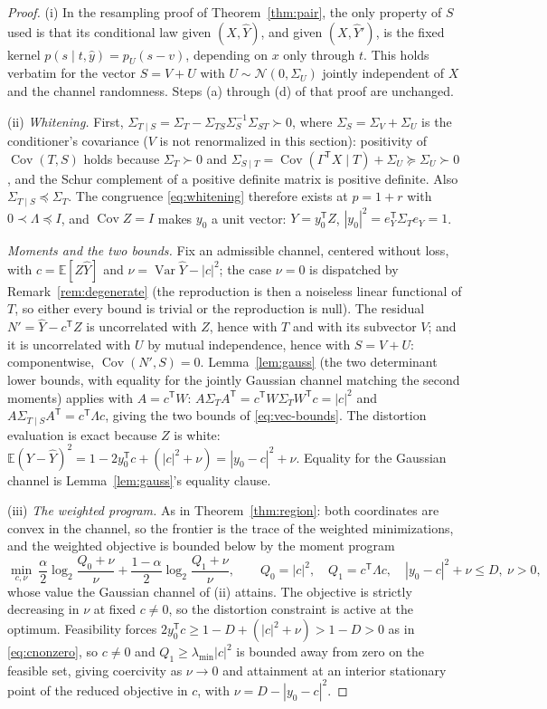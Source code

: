 ﻿\documentclass[11pt,onecolumn]{IEEEtran}
\newcommand{\E}{\mathbb{E}}
\newcommand{\Cov}{\operatorname{Cov}}
\newcommand{\hY}{\widehat{Y}}
\begin{document}
\begin{proof}
(i) In the resampling proof of Theorem~\ref{thm:pair}, the only
property of $S$ used is that its conditional law given $(X,\hY)$, and
given $(X,\hY')$, is the fixed kernel
$p(s\mid t,\hat y)=p_U(s-v)$, depending on $x$ only through $t$. This
holds verbatim for the vector $S=V+U$ with
$U\sim\mathcal N(0,\Sigma_U)$ jointly independent of $X$ and the
channel randomness. Steps (a) through (d) of that proof are unchanged.

(ii) \emph{Whitening.} First,
$\Sigma_{T\mid S}=\Sigma_T-\Sigma_{TS}\Sigma_S^{-1}\Sigma_{ST}\succ0$,
where $\Sigma_S=\Sigma_V+\Sigma_U$ is the conditioner's covariance
($V$ is not renormalized in this section):
positivity of $\Cov(T,S)$ holds because $\Sigma_T\succ0$ and
$\Sigma_{S\mid T}=\Cov(\Gamma^{\mathsf T}X\mid T)+\Sigma_U\succeq
\Sigma_U\succ0$, and the Schur complement of a positive definite
matrix is positive definite. Also $\Sigma_{T\mid S}\preceq\Sigma_T$.
The congruence \eqref{eq:whitening} therefore exists at $p=1+r$ with
$0\prec\Lambda\preceq I$, and $\Cov Z=I$ makes $y_0$ a unit vector:
$Y=y_0^{\mathsf T}Z$, $|y_0|^2=e_Y^{\mathsf T}\Sigma_Te_Y=1$.

\emph{Moments and the two bounds.} Fix an admissible channel, centered
without loss, with $c=\E[Z\hY]$ and
$\nu=\operatorname{Var}\hY-|c|^2$; the case $\nu=0$ is dispatched by
Remark~\ref{rem:degenerate} (the reproduction is then a noiseless
linear functional of $T$, so either every bound is trivial or the
reproduction is null). The residual $N'=\hY-c^{\mathsf T}Z$ is
uncorrelated with $Z$, hence with $T$ and with its subvector $V$; and
it is uncorrelated with $U$ by mutual independence, hence with
$S=V+U$: componentwise, $\Cov(N',S)=0$. Lemma~\ref{lem:gauss} (the two
determinant lower bounds, with equality for the jointly Gaussian
channel matching the second moments) applies with $A=c^{\mathsf T}W$:
$A\Sigma_TA^{\mathsf T}=c^{\mathsf T}W\Sigma_TW^{\mathsf T}c=|c|^2$
and
$A\Sigma_{T\mid S}A^{\mathsf T}=c^{\mathsf T}\Lambda c$, giving the
two bounds of \eqref{eq:vec-bounds}. The distortion evaluation is
exact because $Z$ is white:
$\E(Y-\hY)^2=1-2y_0^{\mathsf T}c+(|c|^2+\nu)=|y_0-c|^2+\nu$. Equality for
the Gaussian channel is Lemma~\ref{lem:gauss}'s equality clause.

(iii) \emph{The weighted program.} As in
Theorem~\ref{thm:region}: both coordinates are convex in the channel,
so the frontier is the trace of the weighted minimizations, and the
weighted objective is bounded below by the moment program
\[
\min_{c,\nu}\
\frac\alpha2\log_2\frac{Q_0+\nu}{\nu}
+\frac{1-\alpha}2\log_2\frac{Q_1+\nu}{\nu},
\qquad
Q_0=|c|^2,\quad
Q_1=c^{\mathsf T}\Lambda c,\quad
|y_0-c|^2+\nu\le D,\ \nu>0,
\]
whose value the Gaussian channel of (ii) attains. The objective is
strictly decreasing in $\nu$ at fixed $c\ne0$, so the distortion
constraint is active at the optimum. Feasibility forces
$2y_0^{\mathsf T}c\ge1-D+(|c|^2+\nu)>1-D>0$ as in \eqref{eq:cnonzero}, so
$c\ne0$ and $Q_1\ge\lambda_{\min}|c|^2$ is bounded away from zero on
the feasible set, giving coercivity as $\nu\to0$ and attainment at an
interior stationary point of the reduced objective in $c$, with
$\nu=D-|y_0-c|^2$.


\end{proof}
\end{document}
